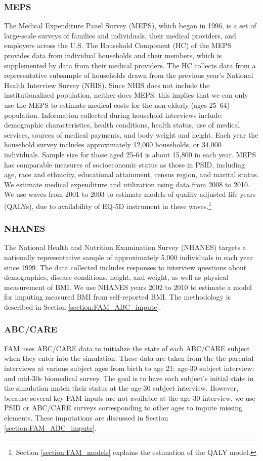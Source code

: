 \subsubsection{MEPS}
\noindent The Medical Expenditure Panel Survey (MEPS), which began in 1996, is a set of large-scale surveys of families and individuals, their medical providers, and employers across the U.S. The Household Component (HC) of the MEPS provides data from
individual households and their members, which is supplemented by data from their medical providers.
The HC collects data from a representative subsample of households drawn from the
previous year's National Health Interview Survey (NHIS). Since NHIS does not include the
institutionalized population, neither does MEPS; this implies that we can only use the MEPS to
estimate medical costs for the non-elderly (ages 25--64) population. Information collected during household
interviews include: demographic characteristics, health conditions, health status, use of medical
services, sources of medical payments, and body weight and height. Each year the household survey
includes approximately 12,000 households, or 34,000 individuals. Sample size for those aged 25-64 is
about 15,800 in each year. MEPS has comparable measures of socioeconomic status as those in PSID,
including age, race and ethnicity, educational attainment, census region, and marital status. We estimate medical expenditure
and utilization using data from 2008 to 2010. We use waves from 2001 to 2003 to estimate models of quality-adjusted life years (QALYs), due to availability of EQ-5D instrument in these waves.\footnote{Section \ref{section:FAM_models} explains the estimation of the QALY model.}


\subsubsection{NHANES}
\noindent
The National Health and Nutrition Examination Survey (NHANES) targets a nationally representative sample of approximately 5,000 individuals in each year since 1999. The data collected includes responses to interview questions about demographics, disease conditions, height, and weight, as well as physical measurement of BMI. We use NHANES years 2002 to 2010 to estimate a model for imputing measured BMI from self-reported BMI. The methodology is described in Section \ref{section:FAM_ABC_impute}.

\subsubsection{ABC/CARE}
\noindent FAM uses ABC/CARE data to initialize the state of each ABC/CARE subject when they enter into the simulation.
These data are taken from the the parental interviews at various subject ages from birth to age 21; age-30 subject interview; and mid-30s biomedical survey.
The goal is to have each subject's initial state in the simulation match their status at the age-30 subject interview. However, because several key FAM inputs are not available at the age-30 interview, we use PSID or ABC/CARE surveys corresponding to other ages to impute missing elements. These imputations are discussed in Section \ref{section:FAM_ABC_impute}.

